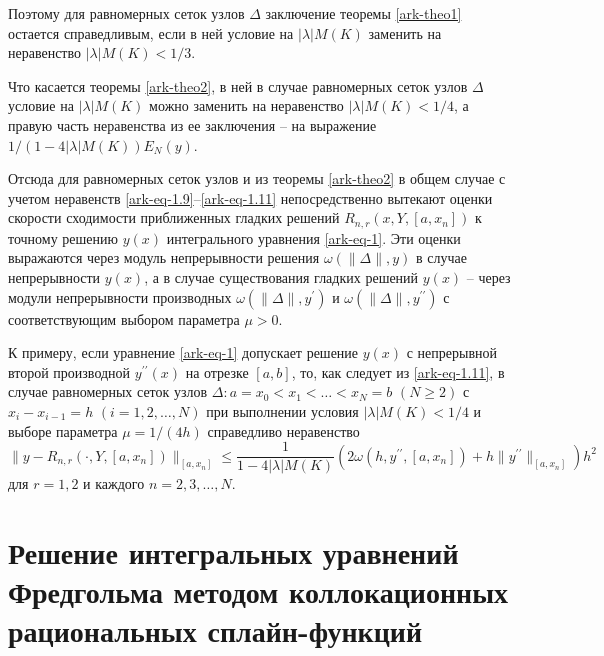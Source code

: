 Поэтому для равномерных сеток узлов $\Delta$ заключение
теоремы \ref{ark-theo1} остается справедливым, если в ней условие
на $|\lambda|M(K)$  заменить на неравенство $|\lambda|M(K)<1/3$.

Что касается теоремы \ref{ark-theo2}, в ней в случае равномерных сеток
узлов $\Delta$ условие на $|\lambda|M(K)$  можно заменить
на неравенство $|\lambda|M(K)<1/4$, а правую часть неравенства из
ее заключения -- на выражение $1/(1-4|\lambda|M(K))E_N(y)$.

Отсюда для равномерных сеток узлов и из теоремы \ref{ark-theo2} в общем случае с учетом
 неравенств \eqref{ark-eq-1.9}--\eqref{ark-eq-1.11}
непосредственно вытекают оценки скорости сходимости приближенных гладких решений
$R_{n,r}(x,Y,[a,x_n])$ к точному решению $y(x)$ интегрального уравнения \eqref{ark-eq-1}.
Эти оценки выражаются через модуль непрерывности решения $\omega(\|\Delta\|,y)$ в случае
непрерывности $y(x)$, а в случае существования гладких решений $y(x)$ --
через модули непрерывности производных
  $\omega(\|\Delta\|,y^\prime)$ и $\omega(\|\Delta\|,y^{\prime\prime})$
с соответствующим выбором параметра $\mu>0$.

К примеру, если уравнение \eqref{ark-eq-1} допускает решение $y(x)$ с непрерывной
второй производной  $y^{\prime\prime}(x)$
на отрезке $[a,b]$, то, как следует из \eqref{ark-eq-1.11}, в случае равномерных сеток узлов
$\Delta: a=x_0<x_1<\dots<x_N=b$ $(N\geqslant 2)$ с $x_i-x_{i-1}=h$ $(i=1,2,\dots,N)$ при
выполнении условия $|\lambda|M(K)<1/4$ и выборе параметра $\mu=1/(4h)$
справедливо неравенство
$$
\|y-R_{n,r}(\cdot,Y,[a,x_n])\|_{[a,x_n]}\leqslant \frac 1{1-4|\lambda|M(K)}
\left(2\omega(h,y^{\prime\prime},[a,x_n])+h\|y^{\prime\prime}\|_{[a,x_n]}\right) h^2
$$
для $r=1,2$ и каждого $n=2,3,\dots,N$.



\section{Решение интегральных уравнений Фредгольма методом
коллокационных рациональных сплайн-функций}

%

